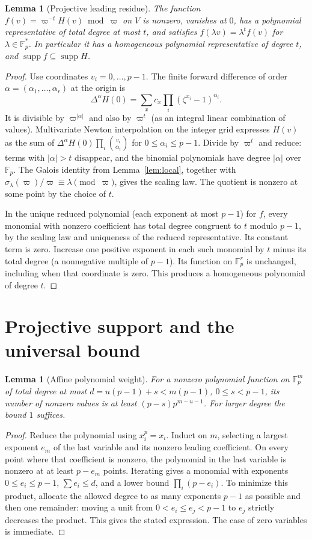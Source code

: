 \documentclass[11pt]{article}
\newtheorem{lemma}[theorem]{Lemma}
\theoremstyle{remark}\newtheorem{remark}[theorem]{Remark}
\newcommand{\F}{\mathbb F}
\newcommand{\supp}{\operatorname{supp}}
\begin{document}
\begin{lemma}[Projective leading residue]\label{lem:residue}
The function $f(v)=\varpi^{-t}H(v)\bmod\varpi$ on $V$ is nonzero, vanishes at $0$, has a polynomial representative of total degree at most $t$, and satisfies $f(\lambda v)=\lambda^t f(v)$ for $\lambda\in\F_p^*$. In particular it has a homogeneous polynomial representative of degree $t$, and $\supp f\subseteq\supp H$.
\end{lemma}
\begin{proof}
Use coordinates $v_i=0,\ldots,p-1$. The finite forward difference of order $\alpha=(\alpha_1,\ldots,\alpha_r)$ at the origin is
\[
 \Delta^\alpha H(0)=\sum_xc_x\prod_i(\zeta^{x_i}-1)^{\alpha_i}.
\]
It is divisible by $\varpi^{|\alpha|}$ and also by $\varpi^t$ (as an integral linear combination of values). Multivariate Newton interpolation on the integer grid expresses $H(v)$ as the sum of $\Delta^\alpha H(0)\prod_i\binom{v_i}{\alpha_i}$ for $0\le\alpha_i\le p-1$. Divide by $\varpi^t$ and reduce: terms with $|\alpha|>t$ disappear, and the binomial polynomials have degree $|\alpha|$ over $\F_p$. The Galois identity from Lemma~\ref{lem:local}, together with $\sigma_\lambda(\varpi)/\varpi\equiv\lambda\pmod\varpi$, gives the scaling law. The quotient is nonzero at some point by the choice of $t$.

In the unique reduced polynomial (each exponent at most $p-1$) for $f$, every monomial with nonzero coefficient has total degree congruent to $t$ modulo $p-1$, by the scaling law and uniqueness of the reduced representative. Its constant term is zero. Increase one positive exponent in each such monomial by $t$ minus its total degree (a nonnegative multiple of $p-1$). Its function on $\F_p^r$ is unchanged, including when that coordinate is zero. This produces a homogeneous polynomial of degree $t$.
\end{proof}

\section{Projective support and the universal bound}
\begin{lemma}[Affine polynomial weight]\label{lem:affine}
For a nonzero polynomial function on $\F_p^m$ of total degree at most $d=u(p-1)+s<m(p-1)$, $0\le s<p-1$, its number of nonzero values is at least $(p-s)p^{m-u-1}$. For larger degree the bound $1$ suffices.
\end{lemma}
\begin{proof}
Reduce the polynomial using $x_i^p=x_i$. Induct on $m$, selecting a largest exponent $e_m$ of the last variable and its nonzero leading coefficient. On every point where that coefficient is nonzero, the polynomial in the last variable is nonzero at at least $p-e_m$ points. Iterating gives a monomial with exponents $0\le e_i\le p-1$, $\sum e_i\le d$, and a lower bound $\prod_i(p-e_i)$. To minimize this product, allocate the allowed degree to as many exponents $p-1$ as possible and then one remainder: moving a unit from $0<e_i\le e_j<p-1$ to $e_j$ strictly decreases the product. This gives the stated expression. The case of zero variables is immediate.
\end{proof}
\end{document}
